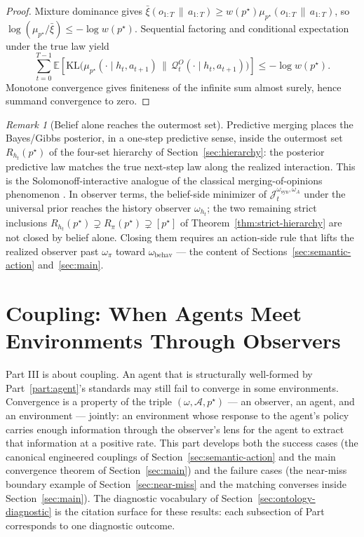 \documentclass[11pt]{article}
\theoremstyle{definition}
\theoremstyle{remark}
\newtheorem{remark}[theorem]{Remark}
\newcommand{\Acal}{\mathcal{A}}
\newcommand{\Qcal}{\mathcal{Q}}
\newcommand{\E}{\mathbb{E}}
\newcommand{\KL}{\mathrm{KL}}
\newcommand{\givena}{\,\|\,}
\newcommand{\barxi}{\bar{\xi}}
\begin{document}
\begin{proof}
Mixture dominance gives $\barxi(o_{1:T}\givena a_{1:T})\ge w(p^\star)\mu_{p^\star}(o_{1:T}\givena a_{1:T})$, so $\log(\mu_{p^\star}/\barxi)\le -\log w(p^\star)$. Sequential factoring and conditional expectation under the true law yield
\[
\sum_{t=0}^{T-1}\E\!\left[\KL\!\bigl(\mu_{p^\star}(\cdot\mid h_t,a_{t+1})\,\|\,\Qcal_t^O(\cdot\mid h_t,a_{t+1})\bigr)\right]
\le -\log w(p^\star).
\]
Monotone convergence gives finiteness of the infinite sum almost surely, hence summand convergence to zero.
\end{proof}

\begin{remark}[Belief alone reaches the outermost set]
\label{rem:belief-reaches-Rht}
Predictive merging places the Bayes/Gibbs posterior, in a one-step predictive sense, inside the outermost set $R_{h_t}(p^\star)$ of the four-set hierarchy of Section~\ref{sec:hierarchy}: the posterior predictive law matches the true next-step law along the realized interaction. This is the Solomonoff-interactive analogue of the classical merging-of-opinions phenomenon \citep{BlackwellDubins1962}. In observer terms, the belief-side minimizer of $\mathcal J_t^{\omega_{\mathrm{syn}},\omega_A}$ under the universal prior reaches the history observer $\omega_{h_t}$; the two remaining strict inclusions $R_{h_t}(p^\star)\supsetneq R_\pi(p^\star)\supsetneq[p^\star]$ of Theorem~\ref{thm:strict-hierarchy} are not closed by belief alone. Closing them requires an action-side rule that lifts the realized observer past $\omega_\pi$ toward $\omega_{\mathrm{behav}}$ --- the content of Sections~\ref{sec:semantic-action} and~\ref{sec:main}.
\end{remark}


\part{Coupling: When Agents Meet Environments Through Observers}
\label{part:coupling}

Part III is about coupling. An agent that is structurally well-formed by Part~\ref{part:agent}'s standards may still fail to converge in some environments. Convergence is a property of the triple $(\omega,\Acal,p^\star)$ --- an observer, an agent, and an environment --- jointly: an environment whose response to the agent's policy carries enough information through the observer's lens for the agent to extract that information at a positive rate. This part develops both the success cases (the canonical engineered couplings of Section~\ref{sec:semantic-action} and the main convergence theorem of Section~\ref{sec:main}) and the failure cases (the near-miss boundary example of Section~\ref{sec:near-miss} and the matching converses inside Section~\ref{sec:main}). The diagnostic vocabulary of Section~\ref{sec:ontology-diagnostic} is the citation surface for these results: each subsection of Part~\ref{part:coupling} corresponds to one diagnostic outcome.
\end{document}
